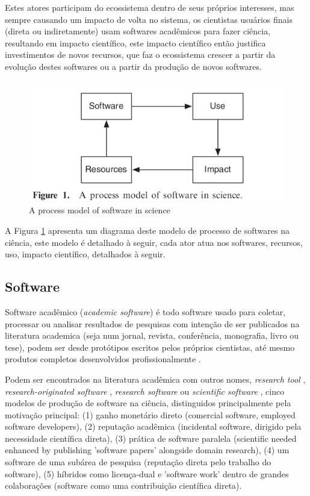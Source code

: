 Estes atores participam do ecossistema dentro de seus próprios interesses, mas
sempre causando um impacto de volta no sistema, os cientistas usuários finais
(direta ou indiretamente) usam softwares acadêmicos para fazer ciência,
resultando em impacto científico, este impacto científico então justifica
investimentos de novos recursos, que faz o ecossistema crescer a partir da
evolução destes softwares ou a partir da produção de novos softwares.

\begin{figure}[h]
  \center
  \includegraphics[scale=0.5]{imagens/process-model-scientific-software.png}
  \caption{A process model of software in science \cite{howison2015understanding}}
  \label{process-model-scientific-software}
\end{figure}

A Figura \ref{process-model-scientific-software} apresenta um diagrama deste
modelo de processo de softwares na ciência, este modelo é detalhado à seguir,
cada ator atua nos softwares, recursos, uso, impacto científico, detalhados à
seguir.

\subsection{Software}

Software acadêmico ({\it academic software}) é todo software usado para
coletar, processar ou analisar resultados de pesquisas com intenção de ser
publicados na literatura academica (seja num jornal, revista, conferência,
monografia, livro ou tese), podem ser desde protótipos escritos pelos próprios
cientistas, até mesmo produtos completos desenvolvidos profissionalmente
\cite{allen2017engineering}.

Podem ser encontrados na literatura acadêmica com outros nomes,
{\it research tool} \cite{Portillo12},
{\it research-originated software} \cite{Kon2011},
{\it research software} \cite{hettrick_2014_14809} ou
{\it scientific software} \cite{segal2008developing},
cinco modelos de produção de software na ciência, distinguidos principalmente
pela motivação principal: (1) ganho monetário direto (comercial software,
employed software developers), (2) reputação acadêmica (incidental software,
dirigido pela necessidade científica direta), (3) prática de software paralela
(scientific needed enhanced by publishing 'software papers' alongside domain research),
(4) um software de uma subárea de pesquisa (reputação direta pelo trabalho do software),
(5) híbridos como licença-dual e 'software work' dentro de grandes colaborações
(software como uma contribuição científica direta).


